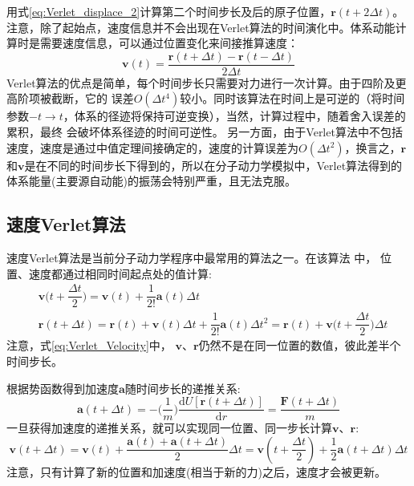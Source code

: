 用式\eqref{eq:Verlet_displace_2}计算第二个时间步长及后的原子位置，$\mathbf{r}(t+2\Delta t)$。%
注意，除了起始点，速度信息并不会出现在\textrm{Verlet}算法的时间演化中。体系动能计算时是需要速度信息，可以通过位置变化来间接推算速度：
\begin{equation}
	\mathbf{v}(t)=\dfrac{\mathbf{r}(t+\Delta t)-\mathbf{r}(t-\Delta t)}{2\Delta t}
	\label{eq:Verlet_V}
\end{equation}
\textrm{Verlet}算法的优点是简单，每个时间步长只需要对力进行一次计算。由于四阶及更高阶项被截断，它的%
误差$O(\Delta t^4)$较小。同时该算法在时间上是可逆的（将时间参数$-t\rightarrow t$，体系的径迹将保持可逆变换），当然，计算过程中，随着舍入误差的累积，最终%
会破坏体系径迹的时间可逆性。
另一方面，由于\textrm{Verlet}算法中不包括速度，速度是通过中值定理间接确定的，速度的计算误差为$O(\Delta t^2)$，换言之，$\mathbf{r}$和$\mathbf{v}$是在不同的时间步长下得到的，所以在分子动力学模拟中，\textrm{Verlet}算法得到的体系能量(主要源自动能)的振荡会特别严重，且无法克服。
\subsection{速度{\rm Verlet}算法}
速度\textrm{Verlet}算法\cite{PR165-201_1968}是当前分子动力学程序中最常用的算法之一。在该算法%
中，%
位置、速度都通过相同时间起点处的值计算:
\begin{equation}
	\begin{aligned}
		&\mathbf{v}\bigg(t+\dfrac{\Delta t}2\bigg)=\mathbf{v}(t)+\dfrac1{2!}\mathbf{a}(t)\Delta t\\
		&\mathbf{r}(t+\Delta t)=\mathbf{r}(t)+\mathbf{v}(t)\Delta t+\dfrac1{2!}\mathbf{a}(t)\Delta t^2=\mathbf{r}(t)+\mathbf{v}\bigg(t+\dfrac{\Delta t}2\bigg)\Delta t 
	\end{aligned}
	\label{eq:Verlet_Velocity}
\end{equation}
注意，式\eqref{eq:Verlet_Velocity}中，%
$\mathbf{v}$、$\mathbf{r}$仍然不是在同一位置的数值，彼此差半个时间步长。

根据势函数得到加速度$\mathbf{a}$随时间步长的递推关系:
\begin{equation}
	\mathbf{a}(t+\Delta t)=-\bigg(\dfrac1m\bigg)\dfrac{\mathrm{d}U[\mathbf{r}(t+\Delta t)]}{\mathrm{d}r}=\dfrac{\mathbf{F}(t+\Delta t)}m 
	\label{eq:Verlet_Velocity_a}
\end{equation} 
一旦获得加速度的递推关系，就可以实现同一位置、同一步长计算$\mathbf{v}$、$\mathbf{r}$:
\begin{equation}
	\mathbf{v}(t+\Delta t)=\mathbf{v}(t)+\dfrac{\mathbf{a}(t)+\mathbf{a}(t+\Delta t)}2\Delta t=\mathbf{v}(t+\dfrac{\Delta t}2)+\dfrac12\mathbf{a}(t+\Delta t)\Delta t 
	\label{eq:Verlet_Velocity_2}
\end{equation}
注意，只有计算了新的位置和加速度(相当于新的力)之后，速度才会被更新。

